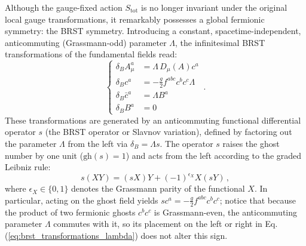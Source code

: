 Although the gauge-fixed action \(S_{\text{tot}}\) is no longer invariant under the original local gauge transformations, it remarkably possesses a global fermionic symmetry: the BRST symmetry. Introducing a constant, spacetime-independent, anticommuting (Grassmann-odd) parameter \(\Lambda\), the infinitesimal BRST transformations of the fundamental fields read:
\begin{equation} \label{eq:brst_transformations_lambda}
    \left\{
    \begin{aligned}
        \delta_B A_\mu^a   & = \Lambda \, D_\mu(A) c^a              \\
        \delta_B c^a       & = -\frac{g}{2} f^{abc} c^b c^c \Lambda \\
        \delta_B \bar{c}^a & = \Lambda B^a                          \\
        \delta_B B^a       & = 0
    \end{aligned}
    \right. \, .
\end{equation}
These transformations are generated by an anticommuting functional differential operator \(s\) (the BRST operator or Slavnov variation), defined by factoring out the parameter \(\Lambda\) from the left via \(\delta_B = \Lambda s\). The operator \(s\) raises the ghost number by one unit (\(\text{gh}(s) = 1\)) and acts from the left according to the graded Leibniz rule:
\[
    s(XY) = (sX)Y + (-1)^{\epsilon_X} X(sY) \, ,
\]
where \(\epsilon_X \in \{0, 1\}\) denotes the Grassmann parity of the functional \(X\). In particular, acting on the ghost field yields \(s c^a = -\frac{g}{2} f^{abc} c^b c^c\); notice that because the product of two fermionic ghosts \(c^b c^c\) is Grassmann-even, the anticommuting parameter \(\Lambda\) commutes with it, so its placement on the left or right in Eq. (\ref{eq:brst_transformations_lambda}) does not alter this sign.

